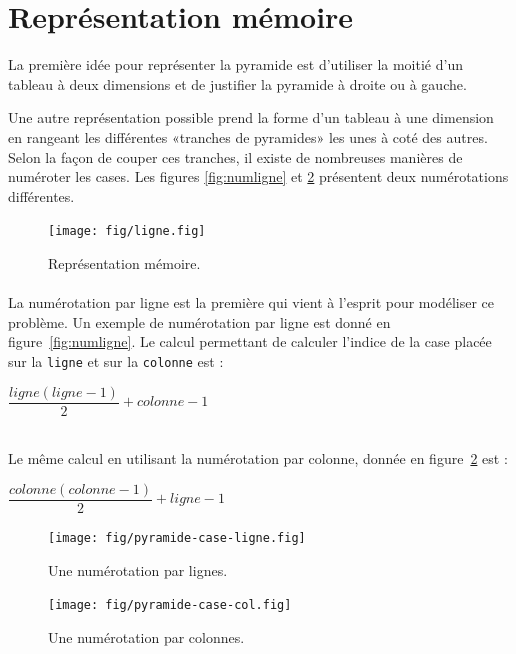 \documentclass[10pt]{article}%
\begin{document}
\section*{Représentation mémoire}
  \noindent La première idée pour représenter la pyramide est d'utiliser la
  moitié d'un tableau à deux dimensions et de justifier la pyramide à droite ou
  à gauche.

  Une autre représentation possible prend la forme d'un tableau à une dimension
  en rangeant les différentes «tranches de pyramides» les unes à coté des
  autres. Selon la façon de couper ces tranches, il existe de nombreuses
  manières de numéroter les cases. Les figures \ref{fig:numligne} et
  \ref{fig:numcol} présentent deux numérotations différentes.


\begin{figure}[h]
  \centering
  \texttt{[image: fig/ligne.fig]}\vspace{-.5\baselineskip}
  \caption{Représentation mémoire.}
  \label{fig:mem}
\end{figure}

\paragraph*{}
  La numérotation par ligne est la première qui vient à l'esprit pour modéliser ce problème.
  Un exemple de numérotation par ligne est donné en figure~\ref{fig:numligne}.
  \noindent Le calcul permettant de calculer l'indice de la case placée sur la \texttt{ligne} et sur
  la \texttt{colonne} est :\\ \centerline{$\dfrac{ligne(ligne-1)}{2}+colonne-1$}\\

  \noindent Le même calcul en utilisant la numérotation par colonne, donnée en figure~\ref{fig:numcol}
  est :\\ \centerline{$\dfrac{colonne(colonne-1)}{2}+ligne-1$}

\begin{figure}[h]
  \begin{minipage}{.45\linewidth}
    \centering
    \texttt{[image: fig/pyramide-case-ligne.fig]}\vspace{-.5\baselineskip}
    \caption{Une numérotation par lignes.}
    \label{fig:numligne}
  \end{minipage}\hfill
  \begin{minipage}{.45\linewidth}
    \centering
    \texttt{[image: fig/pyramide-case-col.fig]}\vspace{-.5\baselineskip}
    \caption{Une numérotation par colonnes.}
    \label{fig:numcol}
  \end{minipage}
\end{figure}
\end{document}
